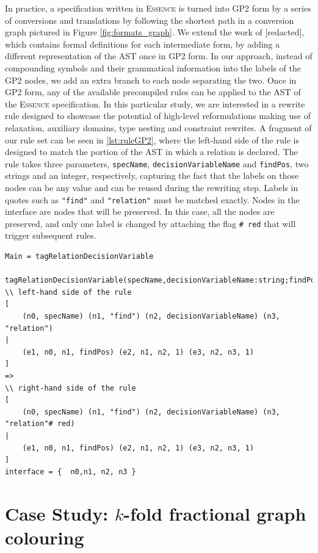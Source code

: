 \documentclass[anonymous,a4paper,UKenglish,cleveref,pdfa]{lipics-v2021}
\newcommand{\essence}{\textsc{Essence}\xspace}
\newcommand{\code}[1]{{\small\texttt{{#1}}}}
\begin{document}
In practice, a specification written in \essence is turned into GP2 form by a series of conversions and translations by following the shortest path in a conversion graph pictured in Figure \ref{fig:formats_graph}. We extend the work of [redacted], %
which contains formal definitions for each intermediate form, by adding a different representation of the AST once in GP2 form. In our approach, instead of compounding symbols and their grammatical information into the labels of the GP2 nodes, we add an extra branch to each node separating the two. Once in GP2 form, any of the available precompiled rules can be applied to the AST of the \essence specification. In this particular study, we are interested in a rewrite rule designed to showcase the potential of high-level reformulations making use of relaxation, auxiliary domains, type nesting and constraint rewrites.
A fragment of our rule set can be seen in \cref{lst:ruleGP2}, where the left-hand side of the rule is designed to match the portion of the AST in which a relation is declared. The rule takes three parameters, \code{specName}, \code{decisionVariableName} and \code{findPos}, two strings and an integer, respectively, capturing the fact that the labels on those nodes can be any value and can be reused during the rewriting step. Labels in quotes such as \code{"find"} and \code{"relation"} must be matched exactly. Nodes in the interface are nodes that will be preserved. In this case, all the nodes are preserved, and only one label is changed by attaching the flag \code{\# red} that will trigger subsequent rules.

\begin{lstlisting}[caption={Tagging a decision variable node implemented in GP2.},label={lst:ruleGP2}]
Main = tagRelationDecisionVariable

tagRelationDecisionVariable(specName,decisionVariableName:string;findPos,n:int)
\\ left-hand side of the rule
[ 
    (n0, specName) (n1, "find") (n2, decisionVariableName) (n3, "relation")
|
    (e1, n0, n1, findPos) (e2, n1, n2, 1) (e3, n2, n3, 1)
]
=>
\\ right-hand side of the rule
[
    (n0, specName) (n1, "find") (n2, decisionVariableName) (n3, "relation"# red)
|
    (e1, n0, n1, findPos) (e2, n1, n2, 1) (e3, n2, n3, 1)
]
interface = {  n0,n1, n2, n3 }
\end{lstlisting}

\section{Case Study: \texorpdfstring{$k$-fold}{k-fold} fractional graph colouring}
\end{document}
